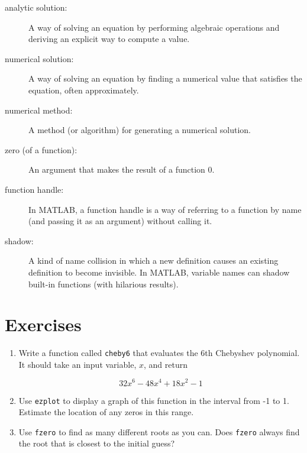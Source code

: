 \documentclass[
]{book}
\numberwithin{Answer}{chapter}
\numberwithin{Exercise}{chapter}
\begin{document}
\begin{description}

\item[analytic solution:] A way of solving an equation by performing
algebraic operations and deriving an explicit way to
compute a value.

\item[numerical solution:] A way of solving an equation by finding
a numerical value that satisfies the equation, often approximately.

\item[numerical method:] A method (or algorithm) for generating
a numerical solution.

\item[zero (of a function):] An argument that makes the result of a function $0$.

\item[function handle:] In MATLAB, a function handle is a way of
referring to a function by name (and passing it as an argument)
without calling it.

\item[shadow:] A kind of name collision in which a new definition
causes an existing definition to become invisible.  In MATLAB,
variable names can shadow built-in functions (with hilarious results).

\end{description}


\section{Exercises}

\begin{ex}

\begin{enumerate}

\item Write a function called {\tt cheby6} that evaluates the
6th Chebyshev polynomial.  It should take an input variable,
$x$, and return

\begin{equation}
32 x^6 - 48 x^4 + 18 x^2 - 1
\end{equation}

\item Use {\tt ezplot} to display a graph of this function in the
interval from -1 to 1.  Estimate the location of any zeros in this
range.

\item Use {\tt fzero} to find as many different roots as you can.
Does {\tt fzero} always find the root that is closest to the initial
guess?

\end{enumerate}

\end{ex}
\end{document}
